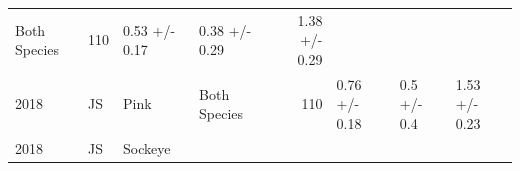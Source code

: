 \documentclass[fleqn,10pt]{wlpeerj} %
\begin{document}
\begin{longtable}[]{@{}llllrlll@{}}
\begin{minipage}[t]{0.11\columnwidth}
Both Species\strut
\end{minipage} & \begin{minipage}[t]{0.04\columnwidth}\raggedleft\strut
110\strut
\end{minipage} & \begin{minipage}[t]{0.14\columnwidth}\raggedright\strut
0.53 +/- 0.17\strut
\end{minipage} & \begin{minipage}[t]{0.14\columnwidth}\raggedright\strut
0.38 +/- 0.29\strut
\end{minipage} & \begin{minipage}[t]{0.14\columnwidth}\raggedright\strut
1.38 +/- 0.29\strut
\end{minipage}\tabularnewline
\begin{minipage}[t]{0.09\columnwidth}\raggedright\strut
2018\strut
\end{minipage} & \begin{minipage}[t]{0.06\columnwidth}\raggedright\strut
JS\strut
\end{minipage} & \begin{minipage}[t]{0.06\columnwidth}\raggedright\strut
Pink\strut
\end{minipage} & \begin{minipage}[t]{0.11\columnwidth}\raggedright\strut
Both Species\strut
\end{minipage} & \begin{minipage}[t]{0.04\columnwidth}\raggedleft\strut
110\strut
\end{minipage} & \begin{minipage}[t]{0.14\columnwidth}\raggedright\strut
0.76 +/- 0.18\strut
\end{minipage} & \begin{minipage}[t]{0.14\columnwidth}\raggedright\strut
0.5 +/- 0.4\strut
\end{minipage} & \begin{minipage}[t]{0.14\columnwidth}\raggedright\strut
1.53 +/- 0.23\strut
\end{minipage}\tabularnewline
\begin{minipage}[t]{0.09\columnwidth}\raggedright\strut
2018\strut
\end{minipage} & \begin{minipage}[t]{0.06\columnwidth}\raggedright\strut
JS\strut
\end{minipage} & \begin{minipage}[t]{0.06\columnwidth}\raggedright\strut
Sockeye\strut
\end{minipage} & \begin{minipage}[t]{0.11\columnwidth}\raggedright\strut

\end{minipage}
\end{longtable}
\end{document}
